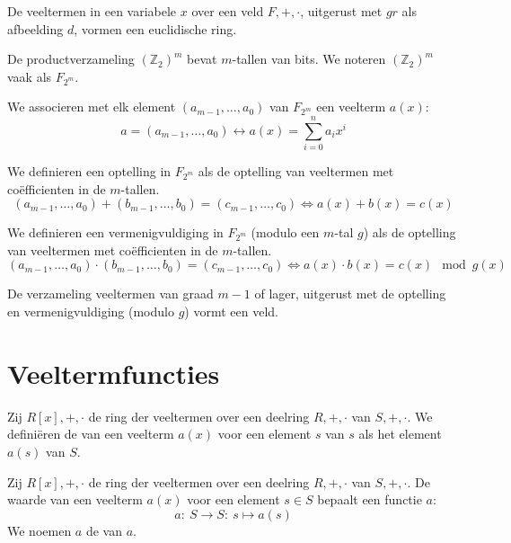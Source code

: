 \documentclass[main.tex]{subfiles}
\begin{document}
\begin{st}
  De veeltermen in een variabele $x$ over een veld $F,+,\cdot$, uitgerust met $gr$ als afbeelding $d$, vormen een euclidische ring.
\end{st}

\begin{de}
  De productverzameling $(\mathbb{Z}_{2})^{m}$ bevat $m$-tallen van bits.
  We noteren $(\mathbb{Z}_{2})^{m}$ vaak als $F_{2^{m}}$.
\end{de}

\begin{de}
  We associeren met elk element $(a_{m-1},\dotsc,a_{0})$ van $F_{2^{m}}$ een veelterm $a(x)$:
  \[ a = (a_{m-1},\dotsc,a_{0}) \longleftrightarrow a(x) = \sum_{i=0}^{n}a_{i}x^{i} \]
\end{de}

\begin{de}
  We definieren een optelling in $F_{2^{m}}$ als de optelling van veeltermen met co\"efficienten in de $m$-tallen.
  \[ (a_{m-1},\dotsc,a_{0}) + (b_{m-1},\dotsc,b_{0}) =  (c_{m-1},\dotsc,c_{0}) \Leftrightarrow a(x) + b(x) = c(x) \]
\end{de}

\begin{de}
  We definieren een vermenigvuldiging in $F_{2^{m}}$ (modulo een $m$-tal $g$) als de optelling van veeltermen met co\"efficienten in de $m$-tallen.
  \[ (a_{m-1},\dotsc,a_{0}) \cdot (b_{m-1},\dotsc,b_{0}) =  (c_{m-1},\dotsc,c_{0}) \Leftrightarrow a(x) \cdot b(x) = c(x) \mod g(x) \]
\end{de}

\begin{ei}
  De verzameling veeltermen van graad $m-1$ of lager, uitgerust met de optelling en vermenigvuldiging (modulo $g$) vormt een veld.
\end{ei}

\section{Veeltermfuncties}
\label{sec:veeltermfuncties}

\begin{de}
  Zij $R[x],+,\cdot$ de ring der veeltermen over een deelring $R,+,\cdot$ van $S,+,\cdot$.
  We defini\"eren de  van een veelterm $a(x)$ voor een element $s$ van $s$ als het element $a(s)$ van $S$.
\end{de}

\begin{de}
  Zij $R[x],+,\cdot$ de ring der veeltermen over een deelring $R,+,\cdot$ van $S,+,\cdot$.
  De waarde van een veelterm $a(x)$ voor een element $s\in S$ bepaalt een functie $a$:
  \[ a:\ S \rightarrow S:\ s \mapsto a(s) \]
  We noemen $a$ de  van $a$.
\end{de}
\end{document}
